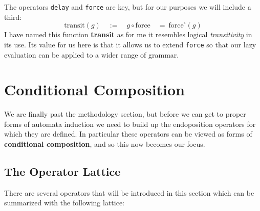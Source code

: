 \documentclass[twoside]{article}
\newcommand{\qdefeq}{\ensuremath{\quad :=\quad}}
\newcommand{\strong}[1]{{\bfseries #1}}
\newcommand{\force}{\mbox{force}}
\newcommand{\transit}{\mbox{transit}}
\begin{document}
The operators \texttt{delay} and \texttt{force} are key, but for our purposes we will include a third:
$$ \transit(g) \qdefeq g \circ \force \quad =\ \force^\circ(g) $$
I have named this function \strong{transit} as for me it resembles logical \emph{transitivity} in its use.
Its value for us here is that it allows us to extend \texttt{force} so that our lazy evaluation can be
applied to a wider range of grammar.

\section*{Conditional Composition}

We are finally past the methodology section, but before we can get to proper forms of automata induction we need
to build up the endoposition operators for which they are defined. In particular these operators can be viewed
as forms of \strong{conditional composition}, and so this now becomes our focus.

\subsection*{The Operator Lattice}

There are several operators that will be introduced in this section which can be summarized with the following lattice:
\end{document}

